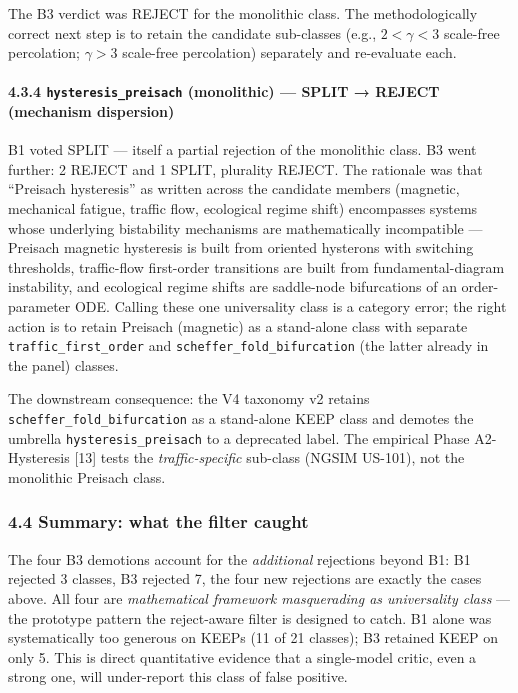 \documentclass[
  letterpaper,
  11pt]{article}
\begin{document}
The B3 verdict was REJECT for the monolithic class. The methodologically
correct next step is to retain the candidate sub-classes (e.g.,
\(2 < \gamma < 3\) scale-free percolation; \(\gamma > 3\) scale-free
percolation) separately and re-evaluate each.

\paragraph{\texorpdfstring{4.3.4 \texttt{hysteresis\_preisach}
(monolithic) --- SPLIT → REJECT (mechanism
dispersion)}{4.3.4 hysteresis\_preisach (monolithic) --- SPLIT → REJECT (mechanism dispersion)}}\label{hysteresis_preisach-monolithic-split-reject-mechanism-dispersion}

B1 voted SPLIT --- itself a partial rejection of the monolithic class.
B3 went further: 2 REJECT and 1 SPLIT, plurality REJECT. The rationale
was that ``Preisach hysteresis'' as written across the candidate members
(magnetic, mechanical fatigue, traffic flow, ecological regime shift)
encompasses systems whose underlying bistability mechanisms are
mathematically incompatible --- Preisach magnetic hysteresis is built
from oriented hysterons with switching thresholds, traffic-flow
first-order transitions are built from fundamental-diagram instability,
and ecological regime shifts are saddle-node bifurcations of an
order-parameter ODE. Calling these one universality class is a category
error; the right action is to retain Preisach (magnetic) as a
stand-alone class with separate \texttt{traffic\_first\_order} and
\texttt{scheffer\_fold\_bifurcation} (the latter already in the panel)
classes.

The downstream consequence: the V4 taxonomy v2 retains
\texttt{scheffer\_fold\_bifurcation} as a stand-alone KEEP class and
demotes the umbrella \texttt{hysteresis\_preisach} to a deprecated
label. The empirical Phase A2-Hysteresis {[}13{]} tests the
\emph{traffic-specific} sub-class (NGSIM US-101), not the monolithic
Preisach class.

\subsubsection{4.4 Summary: what the filter
caught}\label{summary-what-the-filter-caught}

The four B3 demotions account for the \emph{additional} rejections
beyond B1: B1 rejected 3 classes, B3 rejected 7, the four new rejections
are exactly the cases above. All four are \emph{mathematical framework
masquerading as universality class} --- the prototype pattern the
reject-aware filter is designed to catch. B1 alone was systematically
too generous on KEEPs (11 of 21 classes); B3 retained KEEP on only 5.
This is direct quantitative evidence that a single-model critic, even a
strong one, will under-report this class of false positive.
\end{document}
